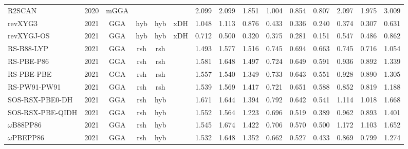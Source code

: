 \begin{landscape}
\begin{longtable}{lc:cccc:rrr:rrr:rrr}
    R2SCAN           & 2020 & mGGA &          &             &           & 2.099             & 2.099             & 1.851  & 1.004              & 0.854             & 0.807  & 2.097   & 1.975 & 3.009 \\
    revXYG3          & 2021 & GGA  & hyb      & hyb         & xDH       & 1.048             & 1.113             & 0.876  & 0.433              & 0.336             & 0.240  & 0.374   & 0.307 & 0.631 \\
    revXYGJ-OS       & 2021 & GGA  & hyb      & hyb         & xDH       & 0.712             & 0.500             & 0.320  & 0.375              & 0.281             & 0.151  & 0.547   & 0.486 & 0.862 \\
    RS-B88-LYP       & 2021 & GGA  & rsh      & rsh         &           & 1.493             & 1.577             & 1.516  & 0.745              & 0.694             & 0.663  & 0.745   & 0.716 & 1.054 \\
    RS-PBE-P86       & 2021 & GGA  & rsh      & rsh         &           & 1.581             & 1.648             & 1.497  & 0.724              & 0.649             & 0.591  & 0.936   & 0.892 & 1.339 \\
    RS-PBE-PBE       & 2021 & GGA  & rsh      & rsh         &           & 1.557             & 1.540             & 1.349  & 0.733              & 0.643             & 0.551  & 0.928   & 0.890 & 1.305 \\
    RS-PW91-PW91     & 2021 & GGA  & rsh      & rsh         &           & 1.539             & 1.569             & 1.417  & 0.721              & 0.651             & 0.588  & 0.852   & 0.819 & 1.188 \\
    SOS-RSX-PBE0-DH  & 2021 & GGA  & rsh      & hyb         &           & 1.671             & 1.644             & 1.394  & 0.792              & 0.642             & 0.541  & 1.114   & 1.018 & 1.668 \\
    SOS-RSX-PBE-QIDH & 2021 & GGA  & rsh      & hyb         &           & 1.552             & 1.564             & 1.223  & 0.696              & 0.519             & 0.389  & 0.962   & 0.893 & 1.401 \\
    $\omega$B88PP86         & 2021 & GGA  & rsh      & hyb         &           & 1.545             & 1.674             & 1.422  & 0.706              & 0.570             & 0.500  & 1.172   & 1.103 & 1.652 \\
    $\omega$PBEPP86         & 2021 & GGA  & rsh      & hyb         &           & 1.532             & 1.648             & 1.352  & 0.662              & 0.527             & 0.433  & 0.869   & 0.799 & 1.274 \\

\end{longtable}
\end{landscape}
